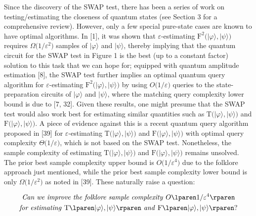 Since the discovery of the SWAP test, there has been a series of work on testing/estimating the closeness of quantum states (see Section 3 for a comprehensive review).
However, only a few special pure-state cases are known to have optimal algorithms.
In [1], it was shown that $\varepsilon$-estimating $\mathrm{F}^{2}\lparen\lvert\varphi\rangle,\lvert\psi\rangle\rparen$ requires $\Omega\lparen 1/\varepsilon^{2}\rparen$ samples of
$\lvert\varphi\rangle$ and $\lvert\psi\rangle$, thereby implying that the quantum circuit for the SWAP test in Figure 1 is the best (up to a constant factor) solution to this task that we can hope for;
equipped with quantum amplitude estimation [8], the SWAP test further implies an optimal quantum query algorithm for $\varepsilon$-estimating $\mathrm{F}^{2}\lparen\lvert\varphi\rangle,\lvert\psi\rangle\rparen$ by using $O\lparen 1/\varepsilon\rparen$ queries to the state-preparation circuits of $\lvert\varphi\rangle$ and $\lvert\psi\rangle$, where the matching query complexity lower bound is due to [7, 32].
Given these results, one might presume that the SWAP test would also work best for estimating similar quantities such as $\mathrm{T}\lparen\lvert\varphi\rangle,\lvert\psi\rangle\rparen$ and $\mathrm{F}\lparen\lvert\varphi\rangle,\lvert\psi\rangle\rparen$.
A piece of evidence against this is a recent quantum query algorithm proposed in [39] for $\varepsilon$-estimating $\mathrm{T}\lparen\lvert\varphi\rangle,\lvert\psi\rangle\rparen$ and $\mathrm{F}\lparen\lvert\varphi\rangle,\lvert\psi\rangle\rparen$ with optimal query complexity $\Theta\lparen 1/\varepsilon\rparen$, which is not based on the SWAP test.
Nonetheless, the sample complexity of estimating $\mathrm{T}\lparen\lvert\varphi\rangle,\lvert\psi\rangle\rparen$ and $\mathrm{F}\lparen\lvert\varphi\rangle,\lvert\psi\rangle\rparen$ remains unsolved.
The prior best sample complexity upper bound is $O\lparen 1/\varepsilon^{4}\rparen$ due to the folklore approach just mentioned, while the prior best sample complexity lower bound is only $\Omega\lparen 1/\varepsilon^{2}\rparen$ as noted in [39].
These naturally raise a question:\par


\[\begin{gathered}
\text{\emph{Can we improve the folklore sample complexity }}O\lparen 1/\varepsilon^{4}\rparen \\
\text{\emph{for estimating }}\mathrm{T}\lparen\lvert\varphi\rangle,\lvert\psi\rangle\rparen\text{\emph{ and }}\mathrm{F}\lparen\lvert\varphi\rangle,\lvert\psi\rangle\rparen\text{?}
\end{gathered}\]


